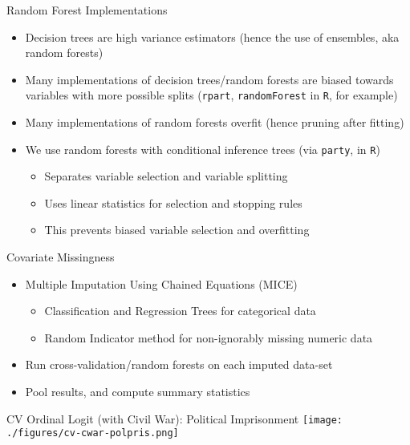 \documentclass{beamer}
\begin{document}
\begin{frame}{Random Forest Implementations}
  \begin{itemize}
  \item Decision trees are high variance estimators (hence the use of ensembles, aka random forests)
  \item Many implementations of decision trees/random forests are biased towards variables with more possible splits (\texttt{rpart}, \texttt{randomForest} in \texttt{R}, for example)
  \item Many implementations of random forests overfit (hence pruning after fitting)
  \item We use random forests with conditional inference trees (via \texttt{party}, in \texttt{R})
    \begin{itemize}
    \item Separates variable selection and variable splitting
    \item Uses linear statistics for selection and stopping rules 
    \item This prevents biased variable selection and overfitting
    \end{itemize}
  \end{itemize}
\end{frame}

\begin{frame}{Covariate Missingness}
  \begin{itemize}
  \item Multiple Imputation Using Chained Equations (MICE)
    \begin{itemize}
    \item Classification and Regression Trees for categorical data
    \item Random Indicator method for non-ignorably missing numeric data
    \end{itemize}
  \item Run cross-validation/random forests on each imputed data-set
  \item Pool results, and compute summary statistics
  \end{itemize}
\end{frame}

\begin{frame}{CV Ordinal Logit (with Civil War): Political Imprisonment}
  \centering
  \texttt{[image: ./figures/cv-cwar-polpris.png]}
\end{frame}
\end{document}
